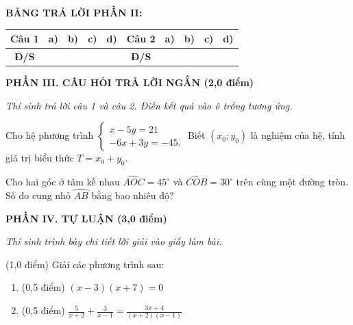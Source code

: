 \documentclass[12pt,a4paper]{article}
\begin{document}
\noindent\textbf{BẢNG TRẢ LỜI PHẦN II:}
\begin{center}
\begin{tabular}{|c|c|c|c|c||c|c|c|c|c|}
\hline
\textbf{Câu 1} & \textbf{a)} & \textbf{b)} & \textbf{c)} & \textbf{d)} & \textbf{Câu 2} & \textbf{a)} & \textbf{b)} & \textbf{c)} & \textbf{d)} \\
\hline
\textbf{Đ/S} & \rule{0pt}{0.6cm} & & & & \textbf{Đ/S} & & & & \\
\hline
\end{tabular}
\end{center}
\vspace{2mm}

\setcounter{ex}{0}
\noindent\textbf{\large PHẦN III. CÂU HỎI TRẢ LỜI NGẮN (2,0 điểm)}

\textit{Thí sinh trả lời câu 1 và câu 2. Điền kết quả vào ô trống tương ứng.}

\vspace{1mm}
\begin{ex}
Cho hệ phương trình $\begin{cases} x - 5y = 21 \\ -6x + 3y = -45. \end{cases}$ Biết $(x_0; y_0)$ là nghiệm của hệ, tính giá trị biểu thức $T = x_0 + y_0$. 
\end{ex}

\begin{ex}
Cho hai góc ở tâm kề nhau $\widehat{AOC} = 45^\circ$ và $\widehat{COB} = 30^\circ$ trên cùng một đường tròn. Số đo cung nhỏ $\wideparen{AB}$ bằng bao nhiêu độ? 
\end{ex}


\setcounter{ex}{0}
\noindent\textbf{\large PHẦN IV. TỰ LUẬN (3,0 điểm)}

\textit{Thí sinh trình bày chi tiết lời giải vào giấy làm bài.}

\vspace{1mm}
\begin{ex} (1,0 điểm)
Giải các phương trình sau:
\begin{enumerate}[label=\textbf{\alph*)}, leftmargin=0.8cm, itemsep=2pt]
\item (0,5 điểm) $(x - 3)(x + 7) = 0$
\item (0,5 điểm) $\frac{5}{x + 2} + \frac{3}{x - 1} = \frac{3x + 4}{(x + 2)(x - 1)}$
\end{enumerate}
\end{ex}
\vspace{0.5mm}
\end{document}
